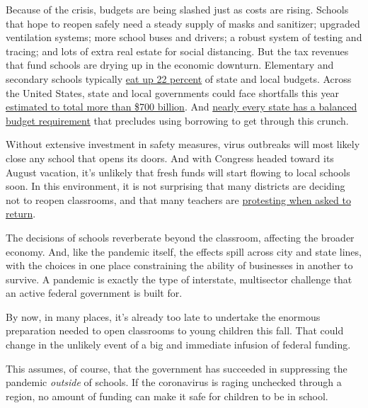 Because of the crisis, budgets are being slashed just as costs are
rising. Schools that hope to reopen safely need a steady supply of masks
and sanitizer; upgraded ventilation systems; more school buses and
drivers; a robust system of testing and tracing; and lots of extra real
estate for social distancing. But the tax revenues that fund schools are
drying up in the economic downturn. Elementary and secondary schools
typically
\href{https://www.pgpf.org/blog/2020/07/pandemic-budget-crunch-could-force-states-to-slash-social-services-education-police-budgets-and-more}{eat
up 22 percent} of state and local budgets. Across the United States,
state and local governments could face shortfalls this year
\href{https://www.forbes.com/sites/lizfarmer/2020/07/14/trump-cant-withhold-education-funding-but-schools-could-face-a-funding-crisis-anyway/\#_blank}{estimated
to total more than \$700 billion}. And
\href{https://www.pgpf.org/blog/2020/07/pandemic-budget-crunch-could-force-states-to-slash-social-services-education-police-budgets-and-more}{nearly
every state has a balanced budget requirement} that precludes using
borrowing to get through this crunch.

Without extensive investment in safety measures, virus outbreaks will
most likely close any school that opens its doors. And with Congress
headed toward its August vacation, it's unlikely that fresh funds will
start flowing to local schools soon. In this environment, it is not
surprising that many districts are deciding not to reopen classrooms,
and that many teachers are
\href{https://www.nytimes3xbfgragh.onion/2020/07/29/us/teacher-union-school-reopening-coronavirus.html?searchResultPosition=1}{protesting
when asked to return}.

The decisions of schools reverberate beyond the classroom, affecting the
broader economy. And, like the pandemic itself, the effects spill across
city and state lines, with the choices in one place constraining the
ability of businesses in another to survive. A pandemic is exactly the
type of interstate, multisector challenge that an active federal
government is built for.

By now, in many places, it's already too late to undertake the enormous
preparation needed to open classrooms to young children this fall. That
could change in the unlikely event of a big and immediate infusion of
federal funding.

This assumes, of course, that the government has succeeded in
suppressing the pandemic \emph{outside} of schools. If the coronavirus
is raging unchecked through a region, no amount of funding can make it
safe for children to be in school.

